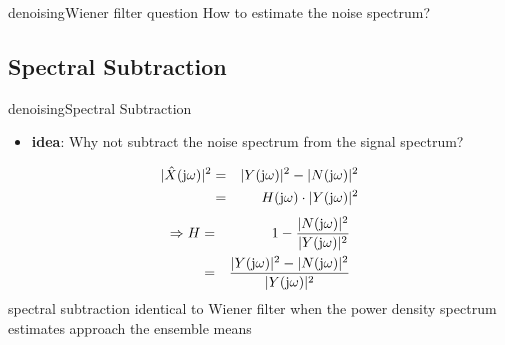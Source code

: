 	\begin{frame}{denoising}{Wiener filter question}
        How to estimate the noise spectrum?
	\end{frame}

\subsection{Spectral Subtraction}
	\begin{frame}{denoising}{Spectral Subtraction}
        \begin{itemize}
            \item[] \textbf{idea}: Why not subtract the noise spectrum from the signal spectrum?
        \end{itemize}
        \begin{eqnarray*}
            |\hat{X}(\mathrm{j}\omega)|^2 &=& |Y(\mathrm{j}\omega)|^2 - |N(\mathrm{j}\omega)|^2\\
            &=& H(\mathrm{j}\omega)\cdot |Y(\mathrm{j}\omega)|^2\\
        \end{eqnarray*}
            \bigskip
            \pause
        \begin{eqnarray*}
            \Rightarrow H &=& 1-\frac{|N(\mathrm{j}\omega)|^2}{|Y(\mathrm{j}\omega)|^2}\\
            &=& \frac{|Y(\mathrm{j}\omega)|^2-|N(\mathrm{j}\omega)|^2}{|Y(\mathrm{j}\omega)|^2}
        \end{eqnarray*}
        \pause
        spectral subtraction identical to  Wiener filter when the power density spectrum estimates approach the ensemble means
	\end{frame}
